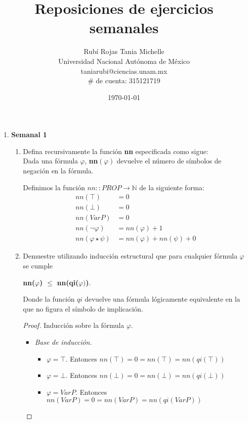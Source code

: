 \documentclass[letterpaper,12pt]{article}
\title{Reposiciones de ejercicios semanales}
\author{Rubí Rojas Tania Michelle \\
        Universidad Nacional Autónoma de México \\
        taniarubi@ciencias.unam.mx \\
        $\#$ de cuenta: 315121719}
\date{\today}
\begin{document}
\maketitle

\begin{enumerate}
    \item \textbf{Semanal 1}
    \begin{enumerate}
        \item Defina recursivamente la función \textbf{nn} especificada como
        sigue: \\
        Dada una fórmula $\varphi$, \textbf{nn}$(\varphi)$ devuelve el número de
        símbolos de negación en la fórmula. 

         Definimos la función $nn :: PROP \rightarrow \mathbb{N}$
        de la siguiente forma:
        \begin{align*}
            nn(\top) &= 0 \\
            nn(\bot) &= 0 \\
            nn(Var P) &= 0 \\
            nn(\neg \varphi) &= nn(\varphi) + 1\\
            nn(\varphi \star \psi) &= nn(\varphi) + nn(\psi) + 0
        \end{align*}
        
        \item Demuestre utilizando inducción estructural que para cualquier 
        fórmula $\varphi$ se cumple 

        \begin{center}
            \textbf{nn($\varphi$) $\leq$ nn(qi($\varphi)$)}. 
        \end{center}

        Donde la función $qi$ devuelve una fórmula lógicamente equivalente en 
        la que no figura el símbolo de implicación.

        \begin{proof}
            Inducción sobre la fórmula $\varphi$.
            \begin{itemize}
                \item \textit{Base de inducción.}
                \begin{itemize}
                    \item $\varphi = \top$. Entonces 
                    $nn(\top) = 0 = nn(\top) = nn(qi(\top))$
                    \item $\varphi = \bot$. Entonces 
                    $nn(\bot) = 0 = nn(\bot) = nn(qi(\bot))$
                    \item $\varphi = Var P$. Entonces
                    $nn(Var P) = 0 = nn(Var P) = nn(qi(Var P))$  
                \end{itemize}


\end{itemize}
\end{proof}
\end{enumerate}
\end{enumerate}
\end{document}
